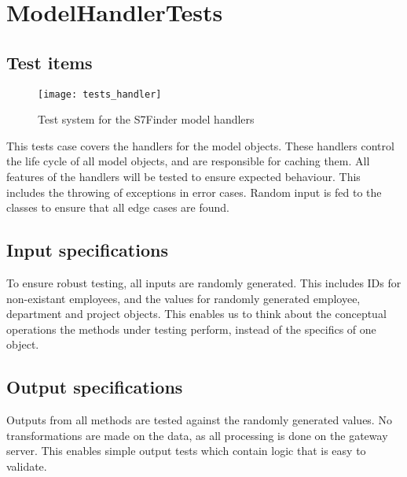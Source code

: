 \section{ModelHandlerTests} %
\label{prt:ModelHandlerTests}

\subsection{Test items} %
\label{sec:Test_items}

\begin{figure}[h!]
    \centerline{\texttt{[image: tests\_handler]}}
    \caption{Test system for the S7Finder model handlers}
    \label{fig:test_system}
\end{figure}

This tests case covers the handlers for the model objects. These handlers
control the life cycle of all model objects, and are responsible for
caching them. All features of the handlers will be tested to ensure
expected behaviour. This includes the throwing of exceptions in error cases.
Random input is fed to the classes to ensure that all edge cases are found.


\subsection{Input specifications} %
\label{sec:Input_specifications}

To ensure robust testing, all inputs are randomly generated. This includes
IDs for non-existant employees, and the values for randomly generated
employee, department and project objects. This enables us to think about
the conceptual operations the methods under testing perform, instead of
the specifics of one object.


\subsection{Output specifications} %
\label{sec:Output_specifications}

Outputs from all methods are tested against the randomly generated values.
No transformations are made on the data, as all processing is done on the
gateway server. This enables simple output tests which contain logic that
is easy to validate.


